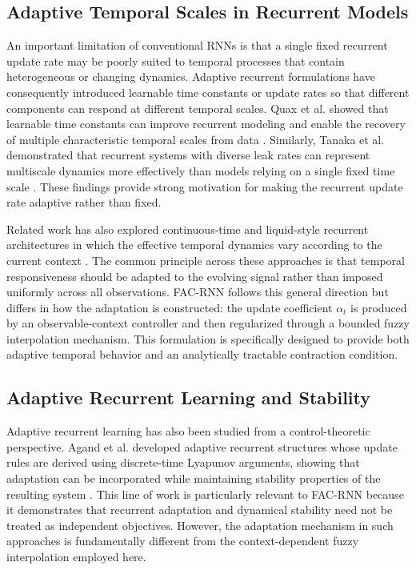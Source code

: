 \documentclass[journal]{IEEEtran}
\begin{document}
\subsection{Adaptive Temporal Scales in Recurrent Models}

An important limitation of conventional RNNs is that a single fixed recurrent update rate may be poorly suited to temporal processes that contain heterogeneous or changing dynamics. Adaptive recurrent formulations have consequently introduced learnable time constants or update rates so that different components can respond at different temporal scales. Quax et al. showed that learnable time constants can improve recurrent modeling and enable the recovery of multiple characteristic temporal scales from data \cite{quax2020adaptivetimescales}. Similarly, Tanaka et al. demonstrated that recurrent systems with diverse leak rates can represent multiscale dynamics more effectively than models relying on a single fixed time scale \cite{tanaka2022reservoir}. These findings provide strong motivation for making the recurrent update rate adaptive rather than fixed.

Related work has also explored continuous-time and liquid-style recurrent architectures in which the effective temporal dynamics vary according to the current context \cite{hasani2021ltc}. The common principle across these approaches is that temporal responsiveness should be adapted to the evolving signal rather than imposed uniformly across all observations. FAC-RNN follows this general direction but differs in how the adaptation is constructed: the update coefficient $\alpha_t$ is produced by an observable-context controller and then regularized through a bounded fuzzy interpolation mechanism. This formulation is specifically designed to provide both adaptive temporal behavior and an analytically tractable contraction condition.

\subsection{Adaptive Recurrent Learning and Stability}

Adaptive recurrent learning has also been studied from a control-theoretic perspective. Agand et al. developed adaptive recurrent structures whose update rules are derived using discrete-time Lyapunov arguments, showing that adaptation can be incorporated while maintaining stability properties of the resulting system \cite{agand2017adaptive}. This line of work is particularly relevant to FAC-RNN because it demonstrates that recurrent adaptation and dynamical stability need not be treated as independent objectives. However, the adaptation mechanism in such approaches is fundamentally different from the context-dependent fuzzy interpolation employed here.
\end{document}
